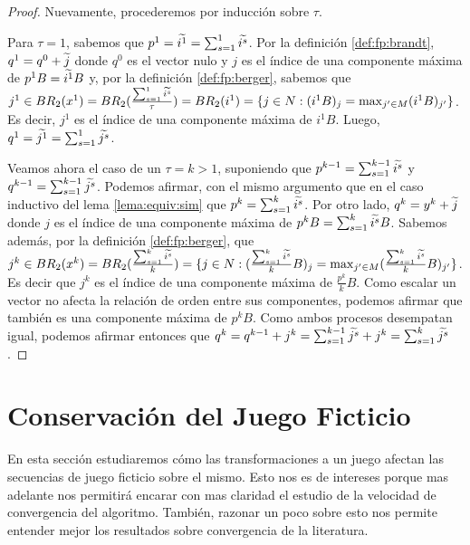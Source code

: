\begin{proof}
    Nuevamente, procederemos por inducción sobre $\tau$.

    Para $\tau = 1$, sabemos que $p^1 = \widetilde{i^1} = \sum_{s=1}^1{\widetilde{i^s}}$. Por la definición \ref{def:fp:brandt}, $q^1 = q^0 + \widetilde{j}$ donde $q^0$ es el vector nulo y $j$ es el índice de una componente máxima de $p^{1}B = \widetilde{i^1}B$ y, por la definición \ref{def:fp:berger}, sabemos que $j^1 \in BR_2(x^1) = BR_2(\frac{\sum^1_{s=1} \widetilde{i^s}}{\tau}) = BR_2(i^1) = \{j \in N : (i^{1}B)_j = \max_{j' \in M} (i^{1}B)_{j'}\}$. Es decir, $j^1$ es el índice de una componente máxima de $i^{1}B$. Luego, $q^1 = \widetilde{j^1} = \sum_{s=1}^1{\widetilde{j^s}}$.

    Veamos ahora el caso de un $\tau = k > 1$, suponiendo que $p^{k-1} = \sum_{s=1}^{k-1}{\widetilde{i^s}}$ y $q^{k-1} = \sum_{s=1}^{k-1}{\widetilde{j^s}}$. Podemos afirmar, con el mismo argumento que en el caso inductivo del lema \ref{lema:equiv:sim} que $p^{k} = \sum_{s=1}^k{\widetilde{i^s}}$. Por otro lado, $q^{k} = y^{k} + \widetilde{j}$ donde $j$ es el índice de una componente máxima de $p^{k}B = \sum_{s=1}^k{\widetilde{i^s}}B$. Sabemos además, por la definición \ref{def:fp:berger}, que $j^k \in BR_2(x^{k}) = BR_2(\frac{\sum_{s=1}^{k}{\widetilde{i^s}}}{k}) = \{j \in N : (\frac{\sum_{s=1}^{k}{\widetilde{i^s}}}{k}B)_j = \max_{j' \in M} (\frac{\sum_{s=1}^{k}{\widetilde{i^s}}}{k}B)_{j'}\}$. Es decir que $j^k$ es el índice de una componente máxima de $\frac{p^k}{k}B$. Como escalar un vector no afecta la relación de orden entre sus componentes, podemos afirmar que también es una componente máxima de $p^{k}B$. Como ambos procesos desempatan igual, podemos afirmar entonces que $q^k = q^{k-1} + j^k = \sum_{s=1}^{k-1}{\widetilde{j^s}} + j^k = \sum_{s=1}^{k}{\widetilde{j^s}}$.

\end{proof}

\section{Conservación del Juego Ficticio}

En esta sección estudiaremos cómo las transformaciones a un juego afectan las secuencias de juego ficticio sobre el mismo. Esto nos es de intereses porque mas adelante nos permitirá encarar con mas claridad el estudio de la velocidad de convergencia del algoritmo. También, razonar un poco sobre esto nos permite entender mejor los resultados sobre convergencia de la literatura.

